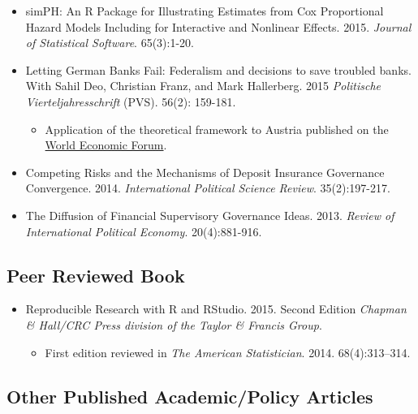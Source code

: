 \documentclass[a4paper]{article}
\begin{document}
\begin{itemize}
    \item simPH: An R Package for Illustrating Estimates from Cox Proportional Hazard Models Including for Interactive and Nonlinear Effects. 2015. {\emph{Journal of Statistical Software}}. 65(3):1-20.

    \item Letting German Banks Fail: Federalism and decisions to save troubled banks. With Sahil Deo, Christian Franz, and Mark Hallerberg. 2015 \emph{Politische Vierteljahresschrift} (PVS). 56(2): 159-181.

        \begin{itemize}
            \item Application of the theoretical framework to Austria published on the \href{https://www.weforum.org/agenda/2015/03/a-bank-bailout-lesson-from-austria/}{World Economic Forum}.
        \end{itemize}

    \item Competing Risks and the Mechanisms of Deposit Insurance Governance Convergence. 2014. {\emph{International Political Science Review}}. 35(2):197-217.

    \item The Diffusion of Financial Supervisory Governance Ideas. 2013. {\emph{Review of International Political Economy}}. 20(4):881-916.

\end{itemize}

\subsection*{Peer Reviewed Book}

\begin{itemize}
    \item Reproducible Research with R and RStudio. 2015. Second Edition {\emph{Chapman \& Hall/CRC Press division of the Taylor \& Francis Group}}.

        \begin{itemize}
            \item First edition reviewed in \emph{The American Statistician}. 2014. 68(4):313--314.
        \end{itemize}

\end{itemize}

\subsection*{Other Published Academic/Policy Articles}
\end{document}
